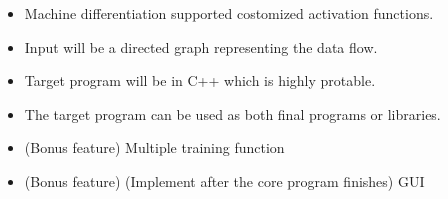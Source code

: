 \begin{itemize}
  \item Machine differentiation supported costomized activation functions.
  \item Input will be a directed graph representing the data flow.
  \item Target program will be in C++ which is highly protable.
  \item The target program can be used as both final programs or libraries.
  \item (Bonus feature) Multiple training function
  \item (Bonus feature) (Implement after the core program finishes) GUI
\end{itemize}